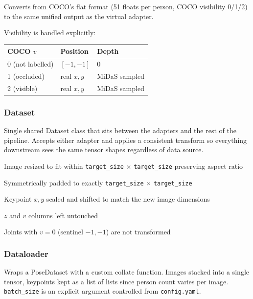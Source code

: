Converts from COCO's flat format (51 floats per person, COCO visibility 0/1/2) to the same unified output as the virtual adapter.

Visibility is handled explicitly:

\begin{center}
\begin{tabular}{lll}
\toprule
COCO $v$ & Position & Depth \\
\midrule
0 (not labelled) & $[-1, -1]$ & 0 \\
1 (occluded) & real $x, y$ & MiDaS sampled \\
2 (visible) & real $x, y$ & MiDaS sampled \\
\bottomrule
\end{tabular}
\end{center}


\subsubsection{Dataset}

Single shared Dataset class that sits between the adapters and the rest of the pipeline. Accepts either adapter and applies a consistent transform so everything downstream sees the same tensor shapes regardless of data source.

\begin{compactitem}
  \item Image resized to fit within \texttt{target\_size} $\times$ \texttt{target\_size} preserving aspect ratio
  \item Symmetrically padded to exactly \texttt{target\_size} $\times$ \texttt{target\_size}
  \item Keypoint $x, y$ scaled and shifted to match the new image dimensions
  \item $z$ and $v$ columns left untouched
  \item Joints with $v=0$ (sentinel $-1, -1$) are not transformed
\end{compactitem}


\subsubsection{Dataloader}

Wraps a PoseDataset with a custom collate function. Images stacked into a single tensor, keypoints kept as a list of lists since person count varies per image. \texttt{batch\_size} is an explicit argument controlled from \texttt{config.yaml}.


